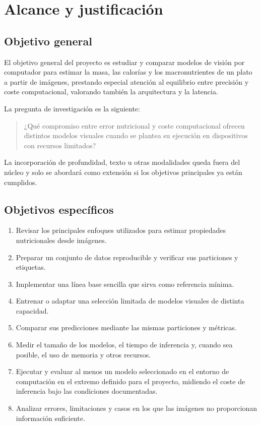 \chapter{Alcance y justificación}
\label{chap:alcance}

\section{Objetivo general}

El objetivo general del proyecto es estudiar y comparar modelos de visión por
computador para estimar la masa, las calorías y los macronutrientes de un plato
a partir de imágenes, prestando especial atención al equilibrio entre precisión
y coste computacional, valorando también la arquitectura y la latencia.

La pregunta de investigación es la siguiente:

\begin{quote}
¿Qué compromiso entre error nutricional y coste computacional ofrecen distintos
modelos visuales cuando se plantea su ejecución en dispositivos con recursos
limitados?
\end{quote}

La incorporación de profundidad, texto u
otras modalidades queda fuera del núcleo y solo se abordará como
extensión si los objetivos principales ya están cumplidos.


\section{Objetivos específicos}

\begin{enumerate}
  \item Revisar los principales enfoques utilizados para estimar propiedades
  nutricionales desde imágenes.
  \item Preparar un conjunto de datos reproducible y verificar sus particiones
  y etiquetas.
  \item Implementar una línea base sencilla que sirva como referencia mínima.
  \item Entrenar o adaptar una selección limitada de modelos visuales de
  distinta capacidad.
  \item Comparar sus predicciones mediante las mismas particiones y métricas.
  \item Medir el tamaño de los modelos, el tiempo de inferencia y, cuando sea
  posible, el uso de memoria y otros recursos.
  \item Ejecutar y evaluar al menos un modelo seleccionado en el entorno de
  computación en el extremo definido para el proyecto, midiendo el coste de
  inferencia bajo las condiciones documentadas. 
  \item Analizar errores, limitaciones y casos en los que las imágenes no
  proporcionan información suficiente.
\end{enumerate}

